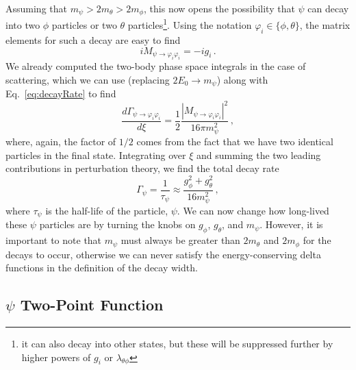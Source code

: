 \documentclass{article}
\numberwithin{equation}{subsection}
\begin{document}
Assuming that $m_\psi > 2m_\theta > 2m_\phi$, this now opens the possibility that $\psi$ can decay into two $\phi$ particles or two $\theta$ particles\footnote{
it can also decay into other states, but these will be suppressed further by higher powers of $g_i$ or $\lambda_{\theta\phi}$}.
Using the notation $\varphi_i \in \{\phi, \theta\}$, the matrix elements for such a decay are easy to find
\begin{equation}
 iM_{\psi \to \varphi_i\varphi_i} = - i g_i\,.
\end{equation}
We already computed the two-body phase space integrals in the case of scattering, which we can use (replacing $2E_0\to m_\psi$) along with Eq.~\eqref{eq:decayRate} to find
\begin{equation}
 \frac{d \Gamma_{\psi\to\varphi_i\varphi_i}}{d\xi} = \frac{1}{2}\frac{|M_{\psi\to\varphi_i\varphi_i}|^2}{16\pi m_\psi^2}\,,
\end{equation}
where, again, the factor of $1/2$ comes from the fact that we have two identical particles in the final state. Integrating over $\xi$ and summing the two
leading contributions in perturbation theory, we find the total decay rate
\begin{equation}\label{eq:psiDecay}
  \Gamma_\psi = \frac{1}{\tau_\psi} \approx \frac{g_\phi^2 + g_\theta^2}{16 m_\psi^2}\,,
\end{equation}
where $\tau_\psi$ is the half-life of the particle, $\psi$. We can now change how long-lived these $\psi$ particles are by turning the knobs on $g_\phi$, $g_\theta$, and $m_\psi$.
However, it is important to note that $m_\psi$ must always be greater than $2m_\theta$ and $2m_\phi$ for the decays to occur, otherwise we can never satisfy
the energy-conserving delta functions in the definition of the decay width.

\subsection{$\psi$ Two-Point Function}
\end{document}
